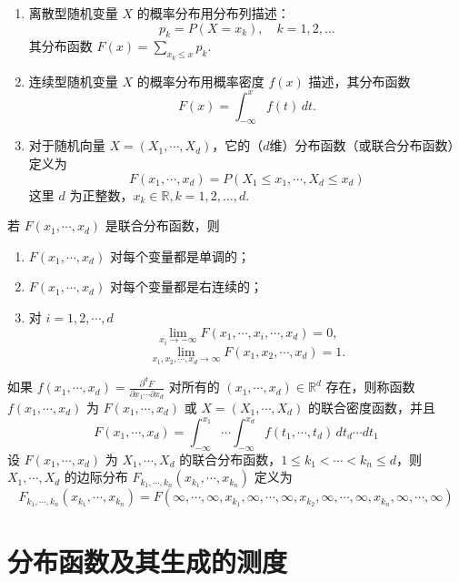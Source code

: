 \documentclass[lang=cn,10pt,thmcnt=section]{elegantbook}
\begin{document}
\begin{enumerate}
    \item 离散型随机变量 $X$ 的概率分布用分布列描述：
    \[
    p_k = P(X = x_k), \quad k = 1, 2, \ldots
    \]
    其分布函数 $F(x) = \sum_{x_k \leq x} p_k$.

    \item 连续型随机变量 $X$ 的概率分布用概率密度 $f(x)$ 描述，其分布函数
    \[
    F(x) = \int_{-\infty}^{x} f(t) \, dt.
    \]

    \item 对于随机向量 $X = (X_1, \cdots, X_d)$，它的（$d$维）分布函数（或联合分布函数）定义为
    \[
    F(x_1, \cdots, x_d) = P(X_1 \leq x_1, \cdots, X_d \leq x_d)
    \]
    这里 $d$ 为正整数，$x_k \in \mathbb{R}, k = 1, 2, \ldots, d$.
\end{enumerate}
\begin{theorem}
	若 $F(x_1, \cdots, x_d)$ 是联合分布函数，则
\begin{enumerate}
    \item $F(x_1, \cdots, x_d)$ 对每个变量都是单调的；
    \item $F(x_1, \cdots, x_d)$ 对每个变量都是右连续的；
    \item 对 $i = 1, 2, \cdots, d$
    \[
    \lim_{x_i \to -\infty} F(x_1, \cdots, x_i, \cdots, x_d) = 0,
    \]
    \[
    \lim_{x_1, x_2, \cdots, x_d \to \infty} F(x_1, x_2, \cdots, x_d) = 1.
    \]
\end{enumerate}
\end{theorem}
\begin{remark}
	
	如果 $f(x_1, \cdots, x_d) = \frac{\partial^d F}{\partial x_1 \cdots \partial x_d}$ 对所有的 $(x_1, \cdots, x_d) \in \mathbb{R}^d$ 存在，则称函数 $f(x_1, \cdots, x_d)$ 为 $F(x_1, \cdots, x_d)$ 或 $X = (X_1, \cdots, X_d)$ 的联合密度函数，并且
\[
F(x_1, \cdots, x_d) = \int_{-\infty}^{x_1} \cdots \int_{-\infty}^{x_d} f(t_1, \cdots, t_d) \, dt_d \cdots dt_1
\]
设 $F(x_1, \cdots, x_d)$ 为 $X_1, \cdots, X_d$ 的联合分布函数，$1 \leq k_1 < \cdots < k_n \leq d$，则 $X_1, \cdots, X_d$ 的边际分布 $F_{k_1, \cdots, k_n}(x_{k_1}, \cdots, x_{k_n})$ 定义为
\[
F_{k_1, \cdots, k_n}(x_{k_1}, \cdots, x_{k_n}) = F(\infty, \cdots, \infty, x_{k_1}, \infty, \cdots, \infty, x_{k_2}, \infty, \cdots, \infty, x_{k_n}, \infty, \cdots, \infty)
\]
\end{remark}

\section{分布函数及其生成的测度}
\end{document}
